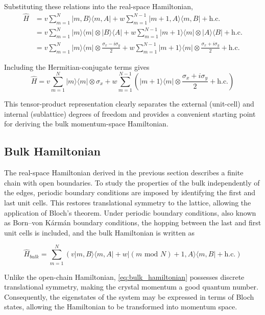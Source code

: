 \documentclass[11pt, a4paper]{article}
\begin{document}
Substituting these relations into the real-space Hamiltonian,
\begin{align*}
\hat H
&=
v\sum_{m=1}^{N}
|m,B\rangle\langle m,A|
+
w\sum_{m=1}^{N-1}
|m+1,A\rangle\langle m,B|
+\mathrm{h.c.}
\\
&=
v\sum_{m=1}^{N}
|m\rangle\langle m|
\otimes
|B\rangle\langle A|
+
w\sum_{m=1}^{N-1}
|m+1\rangle\langle m|
\otimes
|A\rangle\langle B|
+\mathrm{h.c.}
\\
&=
v\sum_{m=1}^{N}
|m\rangle\langle m|
\otimes
\frac{\sigma_x-i\sigma_y}{2}
+
w\sum_{m=1}^{N-1}
|m+1\rangle\langle m|
\otimes
\frac{\sigma_x+i\sigma_y}{2}
+\mathrm{h.c.}
\end{align*}

Including the Hermitian-conjugate terms gives
\begin{equation}
    \hat{H}= v\sum_{m=1}^{N} |m\rangle\langle m| \otimes \sigma_x + w \sum_{m=1}^{N-1} \left( |m+1\rangle\langle m| \otimes \dfrac{\sigma_x+i\sigma_y}{2} + \mathrm{h.c.}\right)
\end{equation}

This tensor-product representation clearly separates the external (unit-cell) and internal (sublattice) degrees of freedom and provides a convenient starting point for deriving the bulk momentum-space Hamiltonian.

\subsection{Bulk Hamiltonian}
The real-space Hamiltonian derived in the previous section describes a finite chain with open boundaries.
To study the properties of the bulk independently of the edges, periodic boundary conditions are imposed by identifying the first and last unit cells\cite{asboth2015,ashcroft1976}.
This restores translational symmetry to the lattice, allowing the application of Bloch's theorem.
Under periodic boundary conditions, also known as Born--von K\'{a}rm\'{a}n boundary conditions, the hopping between the last and first unit cells is included, and the bulk Hamiltonian is written as

\begin{equation}
    \hat{H}_{bulk} = \sum_{m=1}^{N} \left(v|m,B\rangle\langle m,A| + w|(m\text{ mod } N) +1,A\rangle\langle m,B| + \mathrm{h.c.} \right)
\label{eq:bulk_hamiltonian}
\end{equation}

Unlike the open-chain Hamiltonian, \cref{eq:bulk_hamiltonian} possesses discrete translational symmetry, making the crystal momentum a good quantum number.
Consequently, the eigenstates of the system may be expressed in terms of Bloch states, allowing the Hamiltonian to be transformed into momentum space.
\end{document}
